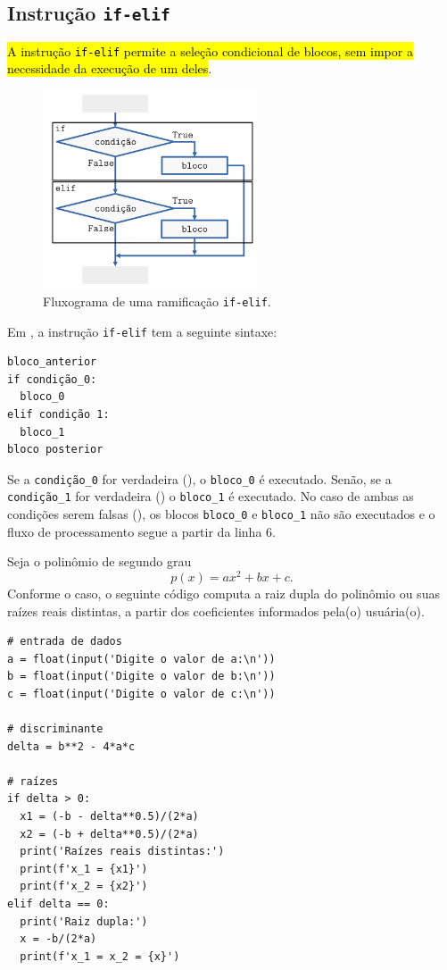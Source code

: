 \subsection{Instrução \texttt{if-elif}}

\hl{A instrução \texttt{if-elif} permite a seleção condicional de blocos, sem impor a necessidade da execução de um deles}.

\begin{figure}[H]
  \centering
  \includegraphics[width=2.5in]{./cap_progest/dados/fig_fg_elif/fig.png}
  \caption{Fluxograma de uma ramificação \lstinline+if-elif+.}
  \label{cap_progest_sec_ramifica:fig:fg_elif}
\end{figure}

Em {\python}, a instrução \lstinline+if-elif+ tem a seguinte sintaxe:

\begin{lstlisting}
bloco_anterior
if condição_0:
  bloco_0
elif condição 1:
  bloco_1
bloco posterior
\end{lstlisting}

Se a \lstinline+condição_0+ for verdadeira ({\PYTHONTrue}), o \lstinline+bloco_0+ é executado. Senão, se a \lstinline+condição_1+ for verdadeira ({\PYTHONTrue}) o \lstinline+bloco_1+ é executado. No caso de ambas as condições serem falsas ({\PYTHONFalse}), os blocos \lstinline+bloco_0+ e \lstinline+bloco_1+ não são executados e o fluxo de processamento segue a partir da linha 6.

\begin{ex}
  Seja o polinômio de segundo grau
  \begin{equation}
    p(x) = ax^2 + bx + c.
  \end{equation}
  Conforme o caso, o seguinte código computa a raiz dupla do polinômio ou suas raízes reais distintas, a partir dos coeficientes informados pela(o) usuária(o).

\begin{lstlisting}
# entrada de dados
a = float(input('Digite o valor de a:\n'))
b = float(input('Digite o valor de b:\n'))
c = float(input('Digite o valor de c:\n'))

# discriminante
delta = b**2 - 4*a*c

# raízes
if delta > 0:
  x1 = (-b - delta**0.5)/(2*a)
  x2 = (-b + delta**0.5)/(2*a)
  print('Raízes reais distintas:')
  print(f'x_1 = {x1}')
  print(f'x_2 = {x2}')
elif delta == 0:
  print('Raiz dupla:')
  x = -b/(2*a)
  print(f'x_1 = x_2 = {x}')
\end{lstlisting}

\end{ex}

